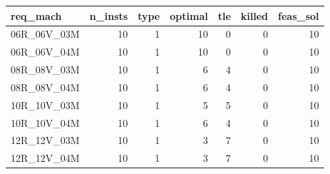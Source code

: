 
\begin{tabular}{lrrrrrr}
\toprule
req\_mach & n\_insts & type & optimal & tle & killed & feas\_sol\\
\midrule
06R\_06V\_03M & 10 & 1 & 10 & 0 & 0 & 10\\
06R\_06V\_04M & 10 & 1 & 10 & 0 & 0 & 10\\
08R\_08V\_03M & 10 & 1 & 6 & 4 & 0 & 10\\
08R\_08V\_04M & 10 & 1 & 6 & 4 & 0 & 10\\
10R\_10V\_03M & 10 & 1 & 5 & 5 & 0 & 10\\
\addlinespace
10R\_10V\_04M & 10 & 1 & 6 & 4 & 0 & 10\\
12R\_12V\_03M & 10 & 1 & 3 & 7 & 0 & 10\\
12R\_12V\_04M & 10 & 1 & 3 & 7 & 0 & 10\\
\bottomrule
\end{tabular}

